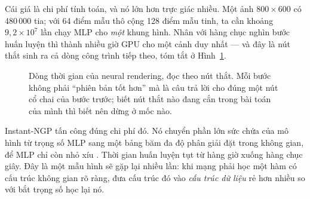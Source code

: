 \documentclass[../../../deep_learning.tex]{subfiles}
\begin{document}
Cái giá là chi phí tính toán, và nó lớn hơn trực giác nhiều. Một ảnh \(800\times 600\) có 480\,000 tia; với 64 điểm mẫu thô cộng 128 điểm mẫu tinh, ta cần khoảng \(9{,}2\times 10^{7}\) lần chạy MLP cho \emph{một} khung hình. Nhân với hàng chục nghìn bước huấn luyện thì thành nhiều giờ GPU cho một cảnh duy nhất --- và đây là nút thắt sinh ra cả dòng công trình tiếp theo, tóm tắt ở Hình~\ref{fig:timeline-nr}.

\begin{figure}[H]\centering
{}
\caption{Dòng thời gian của neural rendering, đọc theo nút thắt. Mỗi bước không phải ``phiên bản tốt hơn'' mà là câu trả lời cho đúng một nút cổ chai của bước trước; biết nút thắt nào đang cắn trong bài toán của mình thì biết nên dừng ở mốc nào.}
\label{fig:timeline-nr}
\end{figure}

Instant-NGP tấn công đúng chi phí đó. Nó chuyển phần lớn sức chứa của mô hình từ trọng số MLP sang một bảng băm đa độ phân giải đặt trong không gian, để MLP chỉ còn nhỏ xíu \cite{mueller2022instant}. Thời gian huấn luyện tụt từ hàng giờ xuống hàng chục giây. Đây là một mẫu hình sẽ gặp lại nhiều lần: khi mạng phải học một hàm có cấu trúc không gian rõ ràng, đưa cấu trúc đó vào \emph{cấu trúc dữ liệu} rẻ hơn nhiều so với bắt trọng số học lại nó.
\end{document}
